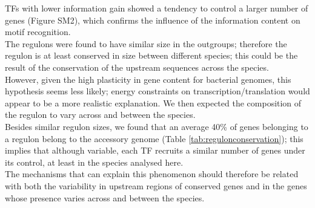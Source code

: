 TFs with lower information gain showed a tendency to control a larger number of genes (Figure SM2), which confirms the influence of the information content on motif recognition.\\
The regulons were found to have similar size in the outgroups; therefore the regulon is at least conserved in size between different species; this could be the result of the conservation of the upstream sequences across the species.\\
However, given the high plasticity in gene content for bacterial genomes, this hypothesis seems less likely; energy constraints on transcription/translation would appear to be a more realistic explanation. We then expected the composition of the regulon to vary across and between the species.\\
Besides similar regulon sizes, we found that an average 40\% of genes belonging to a regulon belong to the accessory genome (Table \ref{tab:regulonconservation}); this implies that although variable, each TF recruits a similar number of genes under its control, at least in the species analysed here.\\
The mechanisms that can explain this phenomenon should therefore be related with both the variability in upstream regions of conserved genes and in the genes whose presence varies across and between the species.\\

